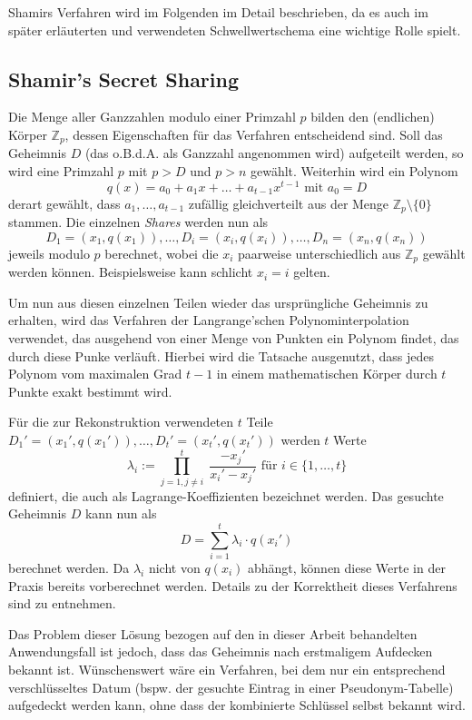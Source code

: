 Shamirs Verfahren wird im Folgenden im Detail beschrieben, da es auch im später erläuterten und verwendeten Schwellwertschema eine wichtige Rolle spielt.

\subsection{Shamir's Secret Sharing}

\label{sec_basics_threshold_shamir}

Die Menge aller Ganzzahlen modulo einer Primzahl \(p\) bilden den (endlichen) Körper \(\mathbb{Z}_p\), dessen Eigenschaften für das Verfahren entscheidend sind. Soll das Geheimnis \(D\) (das o.B.d.A. als Ganzzahl angenommen wird) aufgeteilt werden, so wird eine Primzahl \(p\) mit \(p > D\) und \(p > n\) gewählt. Weiterhin wird ein Polynom 
\[q(x) = a_0 + a_1x + \dots + a_{t-1}x^{t-1} \text{ mit } a_0 = D\] 
derart gewählt, dass \(a_1, \dots, a_{t-1}\) zufällig gleichverteilt aus der Menge \(\mathbb{Z}_p \setminus \{0\}\) stammen. Die einzelnen \textit{Shares} werden nun als
\[D_1=(x_1,q(x_1)), \dots, D_i=(x_i,q(x_i)), \dots, D_n=(x_n,q(x_n))\]
jeweils modulo \(p\) berechnet, wobei die \(x_i\) paarweise unterschiedlich aus \(\mathbb{Z}_p\) gewählt werden können. Beispielsweise kann schlicht \(x_i = i\) gelten.

Um nun aus diesen einzelnen Teilen wieder das ursprüngliche Geheimnis zu erhalten, wird das Verfahren der Langrange'schen Polynominterpolation verwendet, das ausgehend von einer Menge von Punkten ein Polynom findet, das durch diese Punke verläuft. Hierbei wird die Tatsache ausgenutzt, dass jedes Polynom vom maximalen Grad \(t-1\) in einem mathematischen Körper durch \(t\) Punkte exakt bestimmt wird.

Für die zur Rekonstruktion verwendeten \(t\) Teile \(D_1'=(x_1',q(x_1')),\dots,D_t'=(x_t',q(x_t'))\) werden \(t\) Werte 
\[\lambda_i := \prod_{j=1, j \not= i}^{t} \; \frac{- x_j'}{x_i' - x_j'} \text{ für } i \in \{1,\dots,t\}\] 
definiert, die auch als Lagrange-Koeffizienten bezeichnet werden. Das gesuchte Geheimnis \(D\) kann nun als
\[D = \sum_{i=1}^{t}\lambda_i \cdot q(x_i')\]
berechnet werden. Da \(\lambda_i\) nicht von \(q(x_i)\) abhängt, können diese Werte in der Praxis bereits vorberechnet werden. Details zu der Korrektheit dieses Verfahrens sind \cite{boneh2016} zu entnehmen.

Das Problem dieser Lösung bezogen auf den in dieser Arbeit behandelten Anwendungsfall ist jedoch, dass das Geheimnis nach erstmaligem Aufdecken bekannt ist. Wünschenswert wäre ein Verfahren, bei dem nur ein entsprechend verschlüsseltes Datum (bspw. der gesuchte Eintrag in einer Pseudonym-Tabelle) aufgedeckt werden kann, ohne dass der kombinierte Schlüssel selbst bekannt wird. 

